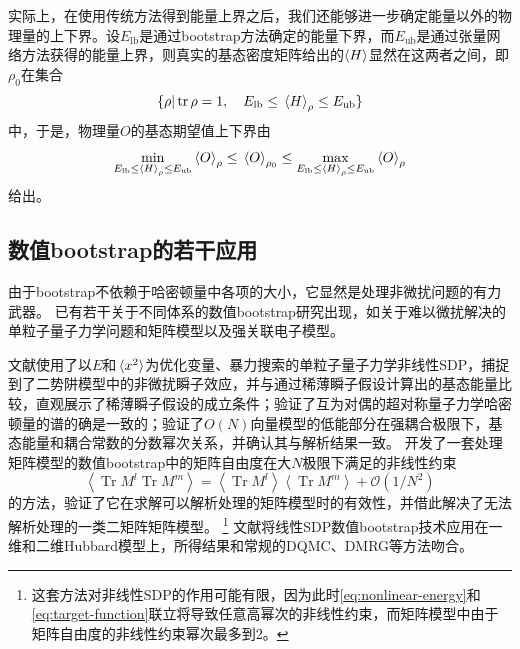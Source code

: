 \documentclass[oneside]{fduthesis}
\begin{document}
实际上，在使用传统方法得到能量上界之后，我们还能够进一步确定能量以外的物理量的上下界\cite{han_manybody}。设$E_\text{lb}$是通过bootstrap方法确定的能量下界，而$E_\text{ub}$是通过张量网络方法获得的能量上界，则真实的基态密度矩阵给出的$\expval{H}$显然在这两者之间，即$\rho_0$在集合
\[
    \{ \rho | \trace \rho = 1, \quad E_\text{lb} \leq \expval*{H}_\rho \leq E_\text{ub} \}
\]
中，于是，物理量$O$的基态期望值上下界由
\begin{equation}
    \min_{E_\text{lb} \leq \expval*{H}_\rho \leq E_\text{ub}} \expval{O}_\rho \leq \expval*{O}_{\rho_0} \leq \max_{E_\text{lb} \leq \expval*{H}_\rho \leq E_\text{ub}} \expval{O}_\rho
    \label{eq:operator-bound}
\end{equation}
给出。

\subsection{数值bootstrap的若干应用}

由于bootstrap不依赖于哈密顿量中各项的大小，它显然是处理非微扰问题的有力武器。
已有若干关于不同体系的数值bootstrap研究出现，如关于难以微扰解决的单粒子量子力学问题和矩阵模型\cite{han_matrix,bhattacharya2021,kazakov2021analytic}以及强关联电子模型\cite{han_manybody}。

文献\parencite{bhattacharya2021}使用了以$E$和$\expval*{x^2}$为优化变量、暴力搜索的单粒子量子力学非线性SDP，捕捉到了二势阱模型中的非微扰瞬子效应，并与通过稀薄瞬子假设计算出的基态能量比较，直观展示了稀薄瞬子假设的成立条件；验证了互为对偶的超对称量子力学哈密顿量的谱的确是一致的；验证了$O(N)$向量模型的低能部分在强耦合极限下，基态能量和耦合常数的分数幂次关系，并确认其与解析结果一致。
\parencite{kazakov2021analytic}开发了一套处理矩阵模型的数值bootstrap中的矩阵自由度在大$N$极限下满足的非线性约束
\begin{equation}
    \left\langle\operatorname{Tr} M^{l} \operatorname{Tr} M^{m}\right\rangle=\left\langle\operatorname{Tr} M^{l}\right\rangle\left\langle\operatorname{Tr} M^{m}\right\rangle+\mathcal{O}\left(1 / N^{2}\right)
\end{equation}
的方法，验证了它在求解可以解析处理的矩阵模型时的有效性，并借此解决了无法解析处理的一类二矩阵矩阵模型。%
\footnote{这套方法对非线性SDP的作用可能有限，因为此时\eqref{eq:nonlinear-energy}和\eqref{eq:target-function}联立将导致任意高幂次的非线性约束，而矩阵模型中由于矩阵自由度的非线性约束幂次最多到2。}%
文献\parencite{han_manybody}将线性SDP数值bootstrap技术应用在一维和二维Hubbard模型上，所得结果和常规的DQMC、DMRG等方法吻合。
\end{document}

